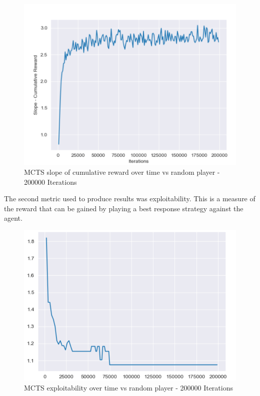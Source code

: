 \begin{figure}[ht]
    \includegraphics[scale=.8]{images/slope_cumulative_reward_vs_random_player.PNG}
    \caption{MCTS slope of cumulative reward over time vs random player - 200000 Iterations}
\end{figure}

The second metric used to produce results was exploitability.
This is a measure of the reward that can be gained by playing a best response strategy
against the agent.

\begin{figure}[ht]
    \includegraphics[scale=.8]{images/exploitability_vs_random_player.PNG}
    \caption{MCTS exploitability over time vs random player - 200000 Iterations}
\end{figure}

